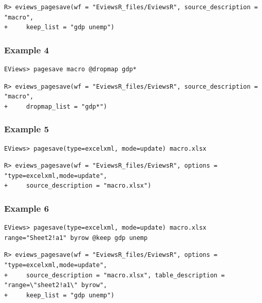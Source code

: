 \begin{verbatim}
R> eviews_pagesave(wf = "EviewsR_files/EviewsR", source_description = "macro",
+     keep_list = "gdp unemp")
\end{verbatim}

\hypertarget{example-4-3}{%
\subsubsection{Example 4}\label{example-4-3}}

\begin{verbatim}
EViews> pagesave macro @dropmap gdp*
\end{verbatim}

\begin{verbatim}
R> eviews_pagesave(wf = "EviewsR_files/EviewsR", source_description = "macro",
+     dropmap_list = "gdp*")
\end{verbatim}

\hypertarget{example-5-3}{%
\subsubsection{Example 5}\label{example-5-3}}

\begin{verbatim}
EViews> pagesave(type=excelxml, mode=update) macro.xlsx
\end{verbatim}

\begin{verbatim}
R> eviews_pagesave(wf = "EviewsR_files/EviewsR", options = "type=excelxml,mode=update",
+     source_description = "macro.xlsx")
\end{verbatim}

\hypertarget{example-6-3}{%
\subsubsection{Example 6}\label{example-6-3}}

\begin{verbatim}
EViews> pagesave(type=excelxml, mode=update) macro.xlsx range="Sheet2!a1" byrow @keep gdp unemp
\end{verbatim}

\begin{verbatim}
R> eviews_pagesave(wf = "EviewsR_files/EviewsR", options = "type=excelxml,mode=update",
+     source_description = "macro.xlsx", table_description = "range=\"sheet2!a1\" byrow",
+     keep_list = "gdp unemp")
\end{verbatim}

